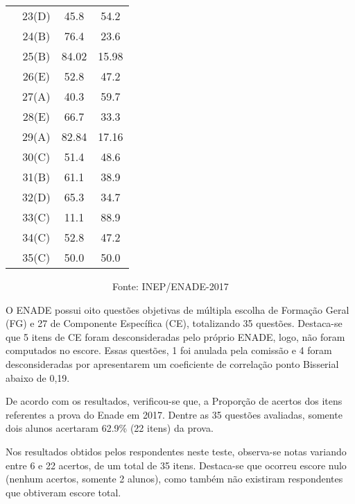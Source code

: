 \documentclass[12pt]{article}
\begin{document}
\begin{table}[!h]
\begin{tabular}{l|c|c|c}
               & 23(D)      &  45.8         &  54.2            \\          
               & 24(B)      &  76.4         &  23.6            \\
               & 25(B)      &  84.02        & 15.98            \\
               & 26(E)      &  52.8         &  47.2        \\              
               & 27(A)      &  40.3         &  59.7            \\
               & 28(E)      &  66.7         &  33.3            \\
               & 29(A)      &  82.84        &  17.16           \\
               & 30(C)      &  51.4         &  48.6            \\
               & 31(B)      &  61.1         &  38.9            \\
               & 32(D)      &  65.3         &  34.7            \\
               & 33(C)      &  11.1         &  88.9            \\
               & 34(C)      &  52.8         &  47.2            \\
               & 35(C)      &  50.0         &  50.0            \\
\hline\hline
\end{tabular}
\vskip0.2cm
\begin{flushleft}
\ \ \ \ \ \ \ \ \ \ \ \ \ \ \ \ \ \ \ \ \ \  Fonte: INEP/ENADE-2017
\end{flushleft}
\end{table}





O ENADE possui oito questões objetivas de múltipla escolha de Formação Geral (FG) e 27 de Componente Específica (CE), totalizando 35 questões. Destaca-se que 5 itens de CE foram desconsideradas pelo próprio ENADE, logo, não foram computados no escore. Essas questões, 1 foi anulada pela comissão e 4 foram desconsideradas por apresentarem um coeficiente de correlação ponto Bisserial abaixo de 0,19.


De acordo com os resultados, verificou-se que, a Proporção de acertos dos itens referentes a prova do Enade em 2017. Dentre as 35 questões avaliadas, somente dois alunos acertaram 62.9\% (22 itens) da prova. 

Nos resultados obtidos pelos respondentes neste teste, observa-se notas variando entre 6 e 22 acertos, de um total de 35 itens. Destaca-se que ocorreu escore nulo (nenhum acertos, somente 2 alunos), como também não existiram respondentes que obtiveram escore total.  
\end{document}
